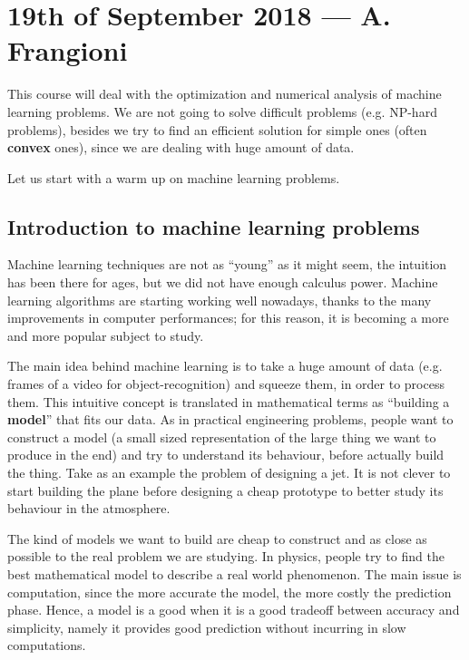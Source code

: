 \documentclass[ComputationalMathematics.tex]{subfiles}
\begin{document}
\section{19th of September 2018 --- A. Frangioni}

This course will deal with the optimization and numerical analysis of machine learning problems.
We are not going to solve difficult problems (e.g. NP-hard problems), besides we try to find an efficient solution for simple ones (often \textbf{convex} ones), since we are dealing with huge amount of data.

Let us start with a warm up on machine learning problems.

\subsection{Introduction to machine learning problems}

Machine learning techniques are not as ``young'' as it might seem, the intuition has been there for ages, but we did not have enough calculus power.
Machine learning algorithms are starting working well nowadays, thanks to the many improvements in computer performances; for this reason, it is becoming a more and more popular subject to study.

The main idea behind machine learning is to take a huge amount of data (e.g. frames of a video for object-recognition) and squeeze them, in order to process them.
This intuitive concept is translated in mathematical terms as ``building a \textbf{model}'' that fits our data.
As in practical engineering problems, people want to construct a model (a small sized representation of the large thing we want to produce in the end) and try to understand its behaviour, before actually build the thing.
Take as an example the problem of designing a jet.
It is not clever to start building the plane before designing a cheap prototype to better study its behaviour in the atmosphere.

The kind of models we want to build are cheap to construct and as close as possible to the real problem we are studying.
In physics, people try to find the best mathematical model to describe a real world phenomenon.
The main issue is computation, since the more accurate the model, the more costly the prediction phase.
Hence, a model is a good when it is a good tradeoff between accuracy and simplicity, namely it provides good prediction without incurring in slow computations.
\end{document}
